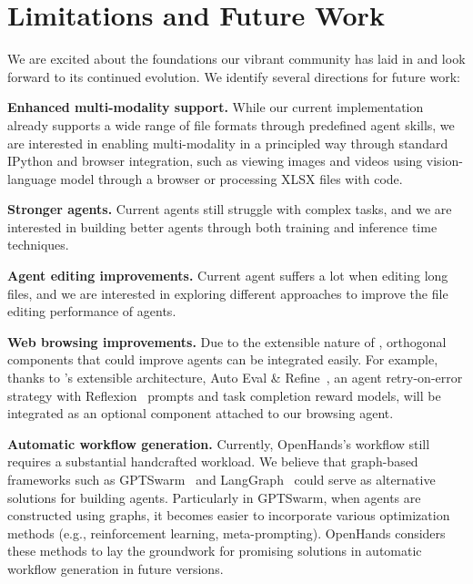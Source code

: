 \section{Limitations and Future Work}
\label{sec:limitation-future-work}
We are excited about the foundations our vibrant community has laid in \projname and look forward to its continued evolution.
We identify several directions for future work:

\textbf{Enhanced multi-modality support.} While our current implementation already supports a wide range of file formats through predefined agent skills, we are interested in enabling multi-modality in a principled way through standard IPython and browser integration, such as viewing images and videos using vision-language model through a browser or processing XLSX files with code.

\textbf{Stronger agents.} Current agents still struggle with complex tasks, and we are interested in building better agents through both training and inference time techniques. 

\textbf{Agent editing improvements.} Current agent suffers a lot when editing long files, and we are interested in exploring different approaches to improve the file editing performance of agents.

\textbf{Web browsing improvements.} Due to the extensible nature of \projname, orthogonal components that could improve agents can be integrated easily. For example, thanks to \projname's extensible architecture, Auto Eval \& Refine~\cite{pan2024autonomous}, an agent retry-on-error strategy with Reflexion~\cite{shinn2024reflexion} prompts and task completion reward models, will be integrated as an optional component attached to our browsing agent.



\textbf{Automatic workflow generation.} Currently, OpenHands's workflow still requires a substantial handcrafted workload. We believe that graph-based frameworks such as GPTSwarm~\cite{zhuge2024language} and LangGraph~\cite{langchain2022} could serve as alternative solutions for building agents. Particularly in GPTSwarm, when agents are constructed using graphs, it becomes easier to incorporate various optimization methods (e.g., reinforcement learning, meta-prompting). OpenHands considers these methods to lay the groundwork for promising solutions in automatic workflow generation in future versions.

